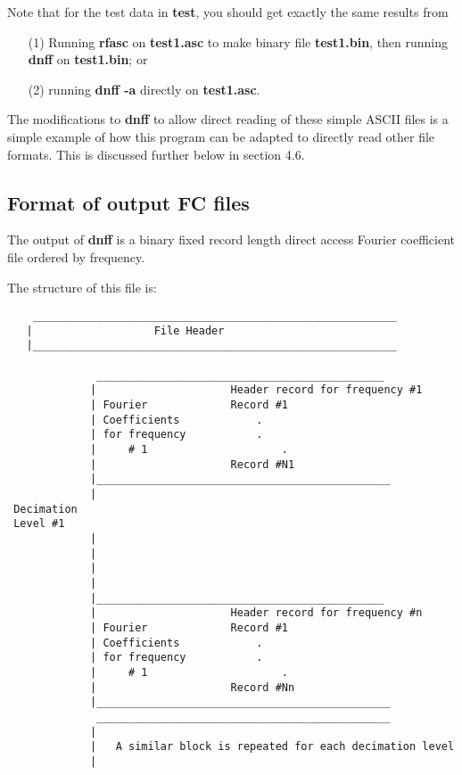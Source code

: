 Note that for the test data in {\bf test},
you should get exactly the same results from 
\begin{itemize}
\item[(1)]
Running  {\bf rfasc} on {\bf test1.asc} to make binary file
{\bf test1.bin}, then running {\bf dnff} on {\bf test1.bin}; or
\item[(2)]
running  {\bf dnff -a} directly on {\bf test1.asc}.
\end{itemize}

The modifications to {\bf dnff} to allow direct reading of these
simple ASCII files is a simple example of how this program can
be adapted to directly read other file formats.  This is discussed
further below in section 4.6.

\subsection{Format of output FC files}

The output of {\bf dnff} is a binary
fixed record length direct access Fourier coefficient file ordered
by frequency.

The structure of this file is:
\small

\begin{verbatim}
    _________________________________________________________
   |                   File Header
   |_________________________________________________________

              _____________________________________________
             |                     Header record for frequency #1
             | Fourier             Record #1
             | Coefficients            .
             | for frequency           .
             |     # 1                     .
             |                     Record #N1
             |______________________________________________
             |
 Decimation                     
 Level #1
             |                           
             | 
             |                           
             |
             |_____________________________________________
             |                     Header record for frequency #n
             | Fourier             Record #1
             | Coefficients            .
             | for frequency           .
             |     # 1                     .
             |                     Record #Nn
             |______________________________________________
              ______________________________________________
             |
             |   A similar block is repeated for each decimation level
             |

\end{verbatim}
\normalsize

